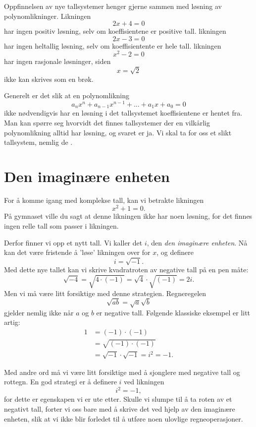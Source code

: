 

\label{ch:komplekse-tall}

Oppfinnelsen av nye tallsystemer henger gjerne sammen med løsning av polynomlikninger. Likningen 
\[
2x+4=0
\]
har ingen positiv løsning, selv om koeffisientene er positive tall. 
likningen
\[
2x-3=0
\]
har ingen heltallig løsning, selv om koeffisientente er hele tall.
likningen
\[
x^2-2=0
\]
har ingen rasjonale løsninger, siden
\[
x=\sqrt{2}
\]
ikke kan skrives som en brøk. 

Generelt er det slik at en polynomlikning
\[
a_nx^n+a_{n-1}x^{n-1}+...+a_1x+a_0=0
\]
ikke nødvendigvis har en løsning i det tallsystemet koeffisientene er hentet fra. 
Man kan spørre seg hvorvidt det finnes tallsystemer der en vilkårlig polynomlikning alltid har løsning, 
og svaret er ja. 
Vi skal ta for oss et slikt tallsystem, nemlig de .


\section*{Den imaginære enheten}
For å komme igang med komplekse tall, kan vi betrakte likningen
\[
x^2+1=0.
\]
På gymnaset ville du sagt at denne likningen ikke har noen løsning, for det finnes ingen relle tall som passer i likningen. 

Derfor finner vi opp et nytt tall. Vi kaller det $i$, den \emph{den imaginære enheten}. 
Nå kan det være fristende å 'løse' likningen over for $x$, og definere
\[
i=\sqrt{-1}.
\]
Med dette nye tallet kan vi skrive kvadratroten av negative tall på en pen måte:
\begin{equation*}
\sqrt{-4}=\sqrt{4\cdot (-1)}=\sqrt{4}\cdot \sqrt{(-1)}=2i.
\end{equation*}
Men vi må være litt forsiktige med denne strategien. 
Regneregelen
\[
\sqrt{ab}=\sqrt{a}\sqrt{b}
\]
gjelder nemlig ikke når $a$ og $b$ er negative tall.
Følgende klassiske eksempel er litt artig:
\begin{align*}
1&=(-1)\cdot(-1)\\&=\sqrt{(-1)\cdot (-1)}\\&=\sqrt{-1}\cdot \sqrt{ -1}=i^2=-1.
\end{align*}

Med andre ord må vi være litt forsiktige med å sjonglere med negative tall og rottegn.
En god strategi er å definere $i$ ved likningen
\[
i^2=-1,
\]
for dette er egenskapen vi er ute etter. 
Skulle vi slumpe til å ta roten av et negativt tall, 
forter vi oss bare med å skrive det ved hjelp av den imaginære enheten, 
slik at vi ikke blir forledet til å utføre noen ulovlige regneoperasjoner.

